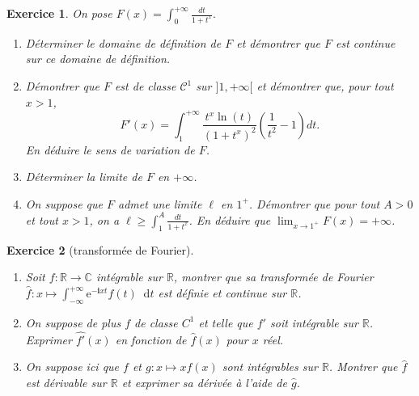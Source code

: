 \documentclass[12pt,a4paper]{article}
\newcommand{\R}{\mathbb{R}}
\newcommand{\C}{\mathbb{C}}
\newcommand{\I}{\mathbf{i}}
\newcommand{\E}{\mathrm{e}}
\newcommand{\diff}{\mathop{}\mathopen{}\mathrm{d}}%
{%
\theoremstyle{break}
\theoremprework{%
\rule{0.5\linewidth}{0.3pt}}
\theorempostwork{\hfill%
\rule{0.5\linewidth}{0.3pt}}
\theoremheaderfont{\scshape}
\theoremseparator{ ---}
\newtheorem{Prop}{%
\textcolor{blue}{Proposition}}[section]
}
\theoremstyle{break}
\newtheorem{Exo}{Exercice}
\begin{document}
\begin{Exo}
	On pose $F(x)=\int_0^{+\infty}\frac{dt}{1+t^x}.$
	\begin{enumerate}
		\item Déterminer le domaine de définition de $F$ et démontrer que $F$ est continue sur ce domaine de définition.
		\item Démontrer que $F$ est de classe $\mathcal C^1$ sur $]1,+\infty[$ et démontrer que, pour tout $x>1$, 
		$$F'(x)=\int_1^{+\infty}\frac{t^x\ln (t)}{(1+t^x)^2}\left(\frac 1{t^2}-1\right)dt.$$
		En déduire le sens de variation de $F$.
		\item Déterminer la limite de $F$ en $+\infty$.
		\item On suppose que $F$ admet une limite $\ell$ en $1^+$. Démontrer que pour tout $A>0$ et tout $x>1$, on a $\ell\geqslant \int_1^A \frac{dt}{1+t^x}$.  En déduire que $\lim_{x\to 1^+}F(x)=+\infty$.
	\end{enumerate}
	
\end{Exo}

\begin{Exo}[transformée de Fourier]\ 
	\begin{enumerate}
		\item
		Soit $f:\R\to\C$ intégrable sur $\R$, montrer que sa transformée de Fourier $\widehat{f}:x\mapsto\int_{-\infty}^{+\infty}\E^{-\I x t}f(t)\diff t$ est définie et continue sur $\R$.
		\item
		On suppose de plus $f$ de classe $C^1$ et telle que $f'$ soit intégrable sur $\R$. Exprimer $\widehat{f'}(x)$ en fonction de $\widehat{f}(x)$ pour $x$ réel.
		\item
		On suppose ici que $f$ et $g:x\mapsto xf(x)$ sont intégrables sur $\R$. Montrer que $\widehat{f}$ est dérivable sur $\R$ et exprimer sa dérivée à l'aide de $\widehat{g}$.
	\end{enumerate}
\end{Exo}
\end{document}

